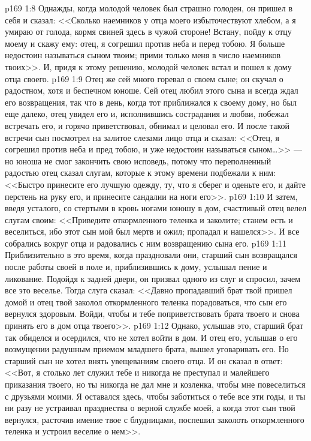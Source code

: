 \vs p169 1:8 Однажды, когда молодой человек был страшно голоден, он пришел в себя и сказал: <<Сколько наемников у отца моего избыточествуют хлебом, а я умираю от голода, кормя свиней здесь в чужой стороне! Встану, пойду к отцу моему и скажу ему: отец, я согрешил против неба и перед тобою. Я больше недостоин называться сыном твоим; прими только меня в число наемников твоих>>. И, придя к этому решению, молодой человек встал и пошел к дому отца своего.
\vs p169 1:9 Отец же сей много горевал о своем сыне; он скучал о радостном, хотя и беспечном юноше. Сей отец любил этого сына и всегда ждал его возвращения, так что в день, когда тот приближался к своему дому, но был еще далеко, отец увидел его и, исполнившись сострадания и любви, побежал встречать его, и горячо приветствовал, обнимал и целовал его. И после такой встречи сын посмотрел на залитое слезами лицо отца и сказал: <<Отец, я согрешил против неба и пред тобою, и уже недостоин называться сыном\ldots >> --- но юноша не смог закончить свою исповедь, потому что переполненный радостью отец сказал слугам, которые к этому времени подбежали к ним: <<Быстро принесите его лучшую одежду, ту, что я сберег и оденьте его, и дайте перстень на руку его, и принесите сандалии на ноги его>>.
\vs p169 1:10 И затем, введя усталого, со стертыми в кровь ногами юношу в дом, счастливый отец велел слугам своим: <<Приведите откормленного теленка и заколите; станем есть и веселиться, ибо этот сын мой был мертв и ожил; пропадал и нашелся>>. И все собрались вокруг отца и радовались с ним возвращению сына его.
\vs p169 1:11 Приблизительно в это время, когда праздновали они, старший сын возвращался после работы своей в поле и, приблизившись к дому, услышал пение и ликование. Подойдя к задней двери, он призвал одного из слуг и спросил, зачем все это веселье. Тогда слуга сказал: <<Давно пропадавший брат твой пришел домой и отец твой заколол откормленного теленка порадоваться, что сын его вернулся здоровым. Войди, чтобы и тебе поприветствовать брата твоего и снова принять его в дом отца твоего>>.
\vs p169 1:12 Однако, услышав это, старший брат так обиделся и осердился, что не хотел войти в дом. И отец его, услышав о его возмущении радушным приемом младшего брата, вышел уговаривать его. Но старший сын не хотел внять увещеваниям своего отца. И он сказал в ответ: <<Вот, я столько лет служил тебе и никогда не преступал и малейшего приказания твоего, но ты никогда не дал мне и козленка, чтобы мне повеселиться с друзьями моими. Я оставался здесь, чтобы заботиться о тебе все эти годы, и ты ни разу не устраивал празднества о верной службе моей, а когда этот сын твой вернулся, расточив имение твое с блудницами, поспешил заколоть откормленного теленка и устроил веселие о нем>>.
